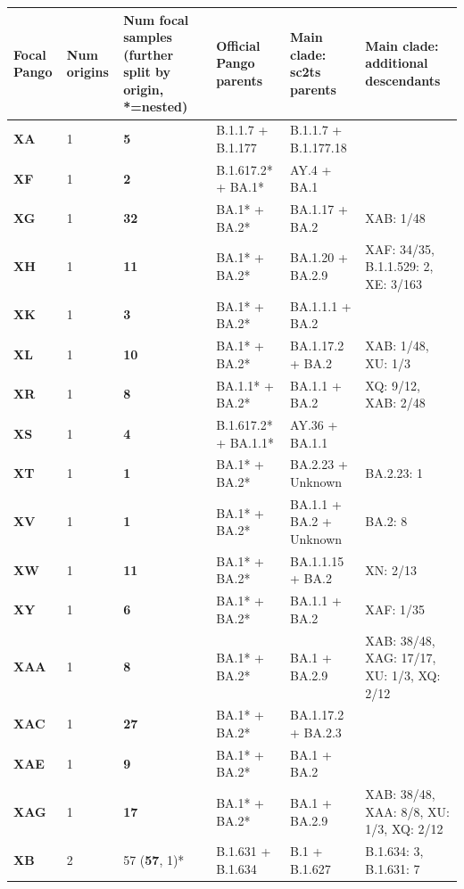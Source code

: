 \documentclass{article}
\begin{document}
\begin{table}
\centering
\begin{tabular}{p{1cm}p{1.2cm}p{4.2cm}lll}
\toprule
Focal Pango  & Num origins & Num focal samples (further split by origin, *=nested) & Official Pango parents & \textbf{Main clade}: sc2ts parents & \textbf{Main clade}: additional descendants \\
\midrule
\bfseries XA & 1 & \textbf{5} & B.1.1.7 + B.1.177 & B.1.1.7 + B.1.177.18 &  \\
\bfseries XF & 1 & \textbf{2} & B.1.617.2* + BA.1* & AY.4 + BA.1 &  \\
\bfseries XG & 1 & \textbf{32} & BA.1* + BA.2* & BA.1.17 + BA.2 & XAB: 1/48 \\
\bfseries XH & 1 & \textbf{11} & BA.1* + BA.2* & BA.1.20 + BA.2.9 & XAF: 34/35, B.1.1.529: 2, XE: 3/163 \\
\bfseries XK & 1 & \textbf{3} & BA.1* + BA.2* & BA.1.1.1 + BA.2 &  \\
\bfseries XL & 1 & \textbf{10} & BA.1* + BA.2* & BA.1.17.2 + BA.2 & XAB: 1/48, XU: 1/3 \\
\bfseries XR & 1 & \textbf{8} & BA.1.1* + BA.2* & BA.1.1 + BA.2 & XQ: 9/12, XAB: 2/48 \\
\bfseries XS & 1 & \textbf{4} & B.1.617.2* + BA.1.1* & AY.36 + BA.1.1 &  \\
\bfseries XT & 1 & \textbf{1} & BA.1* + BA.2* & BA.2.23 + Unknown & BA.2.23: 1 \\
\bfseries XV & 1 & \textbf{1} & BA.1* + BA.2* & BA.1.1 + BA.2 + Unknown & BA.2: 8 \\
\bfseries XW & 1 & \textbf{11} & BA.1* + BA.2* & BA.1.1.15 + BA.2 & XN: 2/13 \\
\bfseries XY & 1 & \textbf{6} & BA.1* + BA.2* & BA.1.1 + BA.2 & XAF: 1/35 \\
\bfseries XAA & 1 & \textbf{8} & BA.1* + BA.2* & BA.1 + BA.2.9 & XAB: 38/48, XAG: 17/17, XU: 1/3, XQ: 2/12 \\
\bfseries XAC & 1 & \textbf{27} & BA.1* + BA.2* & BA.1.17.2 + BA.2.3 &  \\
\bfseries XAE & 1 & \textbf{9} & BA.1* + BA.2* & BA.1 + BA.2 &  \\
\bfseries XAG & 1 & \textbf{17} & BA.1* + BA.2* & BA.1 + BA.2.9 & XAB: 38/48, XAA: 8/8, XU: 1/3, XQ: 2/12 \\
\bfseries XB & 2 & 57 (\textbf{57}, 1)* & B.1.631 + B.1.634 & B.1 + B.1.627 & B.1.634: 3, B.1.631: 7 \\

\end{tabular}
\end{table}
\end{document}
